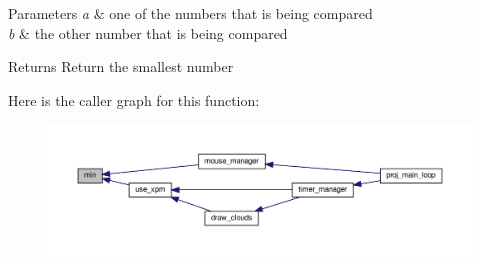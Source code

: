 \begin{DoxyParams}{Parameters}
{\em a} & one of the numbers that is being compared \\
\hline
{\em b} & the other number that is being compared\\
\hline
\end{DoxyParams}
\begin{DoxyReturn}{Returns}
Return the smallest number 
\end{DoxyReturn}
Here is the caller graph for this function\+:
\nopagebreak
\begin{figure}[H]
\begin{center}
\leavevmode
\includegraphics[width=350pt]{group__myutils_ga86fabf639ab773666d2c7936b104a668_icgraph}
\end{center}
\end{figure}

